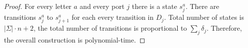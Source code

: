 \begin{proof}
    For every letter $a$ and every port $j$ there is a state $s^a_j$. There are transitions $s^a_j$ to $s^a_{j+1}$ for each every transition in $D_j$. Total number of states is $|\Sigma| \cdot n + 2$, the total number of transitions is proportional to $\sum_j \delta_j$.  Therefore, the overall construction is polynomial-time.


\end{proof}